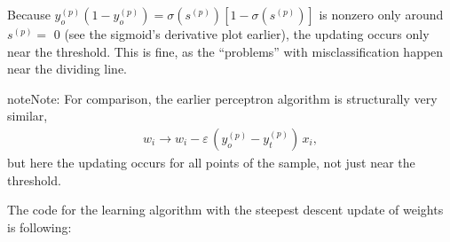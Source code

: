 \documentclass[letterpaper,10pt,english]{jupyterBook}
\begin{document}
\sphinxAtStartPar
Because \( y_o ^ {(p)} (1-y_o ^ {(p)}) = \sigma (s ^ {(p)}) [1- \sigma (s ^ {(p)})] \) is nonzero only around \( s ^ {(p)} = \) 0 (see the sigmoid’s derivative plot earlier), the updating occurs only near the threshold. This is fine, as the “problems” with misclassification happen near the dividing line.

\begin{sphinxadmonition}{note}{Note:}
\sphinxAtStartPar
For comparison, the earlier perceptron algorithm is structurally very similar,
\begin{equation*}
\begin{split}w_i \to w_i - \varepsilon \,(y_o^{(p)} - y_t^{(p)}) \, x_i,\end{split}
\end{equation*}
\sphinxAtStartPar
but here the updating occurs for all points of the sample, not just near the threshold.
\end{sphinxadmonition}

\sphinxAtStartPar
The code for the learning algorithm with the steepest descent update of weights is following:
\end{document}
